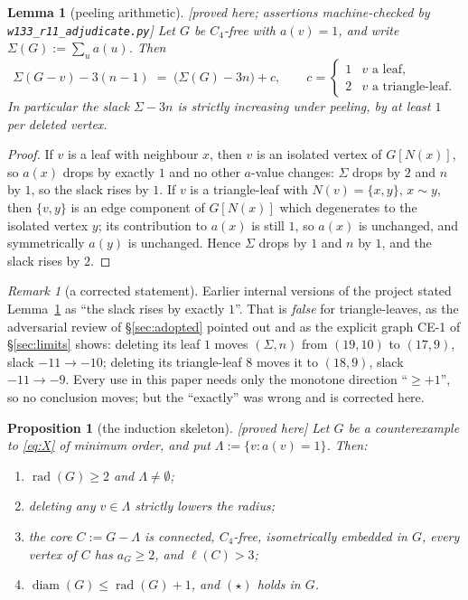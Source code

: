\documentclass[11pt]{article}
\theoremstyle{plain}
\newtheorem{lemma}[theorem]{Lemma}
\newtheorem{proposition}[theorem]{Proposition}
\theoremstyle{definition}
\theoremstyle{remark}
\newtheorem{remark}[theorem]{Remark}
\numberwithin{equation}{section}
\newcommand{\rad}{\operatorname{rad}}
\newcommand{\diam}{\operatorname{diam}}
\newcommand{\statusbox}[1]{{\small\sloppy\textsf{[#1]}}}
\newcommand{\PRV}[1]{\statusbox{proved here; assertions machine-checked by \texttt{#1}}}
\newcommand{\PRVn}{\statusbox{proved here}}
\begin{document}
\begin{lemma}[peeling arithmetic]\label{lem:g11}
\PRV{w133\_r11\_adjudicate.py}
Let $G$ be $C_4$-free with $a(v) = 1$, and write $\Sigma(G) := \sum_u a(u)$. Then
\[
  \Sigma(G-v) - 3(n-1) \;=\; \bigl(\Sigma(G) - 3n\bigr) + c, \qquad
  c = \begin{cases} 1 & v \text{ a leaf},\\ 2 & v \text{ a triangle-leaf}.\end{cases}
\]
In particular the slack $\Sigma - 3n$ is strictly increasing under peeling, by at least $1$
per deleted vertex.
\end{lemma}

\begin{proof}
If $v$ is a leaf with neighbour $x$, then $v$ is an isolated vertex of $G[N(x)]$, so $a(x)$
drops by exactly $1$ and no other $a$-value changes: $\Sigma$ drops by $2$ and $n$ by $1$,
so the slack rises by $1$. If $v$ is a triangle-leaf with $N(v) = \{x,y\}$, $x \sim y$, then
$\{v,y\}$ is an edge component of $G[N(x)]$ which degenerates to the isolated vertex $y$;
its contribution to $a(x)$ is still $1$, so $a(x)$ is unchanged, and symmetrically $a(y)$ is
unchanged. Hence $\Sigma$ drops by $1$ and $n$ by $1$, and the slack rises by $2$.
\end{proof}

\begin{remark}[a corrected statement]\label{rem:b10}
Earlier internal versions of the project stated Lemma~\ref{lem:g11} as ``the slack rises by
exactly $1$''. That is \emph{false} for triangle-leaves, as the adversarial review of
\S\ref{sec:adopted} pointed out and as the explicit graph CE-1 of \S\ref{sec:limits} shows:
deleting its leaf $1$ moves $(\Sigma,n)$ from $(19,10)$ to $(17,9)$, slack $-11 \to -10$;
deleting its triangle-leaf $8$ moves it to $(18,9)$, slack $-11 \to -9$. Every use in this
paper needs only the monotone direction ``$\ge +1$'', so no conclusion moves; but the
``exactly'' was wrong and is corrected here.
\end{remark}

\begin{proposition}[the induction skeleton]\label{prop:skeleton}
\PRVn
Let $G$ be a counterexample to \eqref{eq:X} of minimum order, and put
$\Lambda := \{v : a(v) = 1\}$. Then:
\begin{enumerate}
\item[(i)] $\rad(G) \ge 2$ and $\Lambda \ne \emptyset$;
\item[(ii)] deleting any $v \in \Lambda$ strictly lowers the radius;
\item[(iii)] the \emph{core} $C := G - \Lambda$ is connected, $C_4$-free, isometrically
embedded in $G$, every vertex of $C$ has $a_G \ge 2$, and $\ell(C) > 3$;
\item[(iv)] $\diam(G) \le \rad(G) + 1$, and $(\star)$ holds in $G$.
\end{enumerate}
\end{proposition}
\end{document}
